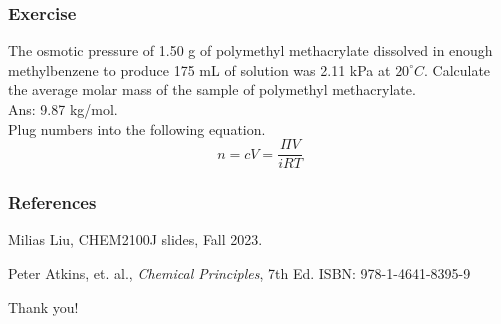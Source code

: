 \documentclass[aspectratio=169]{beamer}
\def\blankline{\\[6pt]}
\begin{document}
\begin{frame}
  \frametitle{Exercise}
  The osmotic pressure of 1.50 g of polymethyl methacrylate dissolved in enough methylbenzene to produce 
  175 mL of solution was 2.11 kPa at $20^{\circ}C$. Calculate the average molar mass of the sample of polymethyl methacrylate.
  \pause
  \blankline
  Ans: 9.87 kg/mol. \\
  Plug numbers into the following equation.
  \begin{equation*}
    n = cV = \frac{\Pi V}{iRT}
  \end{equation*}
\end{frame}
\begin{frame}
  \frametitle{References}
  
  \begin{thebibliography}{99} %
  Milias Liu, CHEM2100J slides, Fall 2023.
    
  Peter Atkins, et. al., \textit{Chemical Principles}, 7th Ed. ISBN: 978-1-4641-8395-9
    
  \end{thebibliography}
  \end{frame}

\begin{frame}
  \Huge{\centerline{Thank you!}}
\end{frame}
\end{document}
